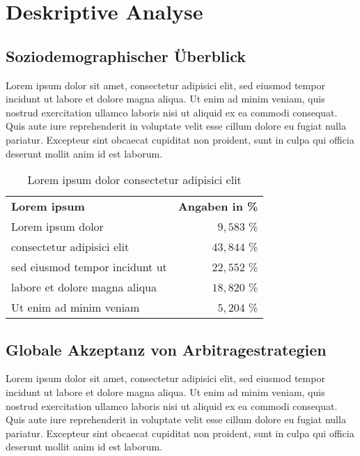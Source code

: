 \section{Deskriptive Analyse}
\subsection{Soziodemographischer Überblick}
Lorem ipsum dolor sit amet, consectetur adipisici elit, sed eiusmod tempor incidunt ut labore et dolore magna aliqua. Ut enim ad minim veniam, quis nostrud exercitation ullamco laboris nisi ut aliquid ex ea commodi consequat. Quis aute iure reprehenderit in voluptate velit esse cillum dolore eu fugiat nulla pariatur. Excepteur sint obcaecat cupiditat non proident, sunt in culpa qui officia deserunt mollit anim id est laborum.

\begin{table}[!ht]
     \centering
     \begin{tabular}{lr}
       \textbf{Lorem ipsum}  & \textbf{Angaben in \%}\\
       Lorem ipsum dolor            & $9{,}583 $ \%             \\
       consectetur adipisici elit       & $43{,}844 $ \%             \\
       sed eiusmod tempor incidunt ut  & $22{,}552 $ \%             \\
       labore et dolore magna aliqua &  $18{,}820 $ \%           \\
       Ut enim ad minim veniam & $5{,}204 $ \%\\
     \end{tabular}

     \caption{Lorem ipsum dolor consectetur adipisici elit}
     \label{tbl:Tabelle 2}

   \end{table}
   

\subsection{Globale Akzeptanz von Arbitragestrategien}
Lorem ipsum dolor sit amet, consectetur adipisici elit, sed eiusmod tempor incidunt ut labore et dolore magna aliqua. Ut enim ad minim veniam, quis nostrud exercitation ullamco laboris nisi ut aliquid ex ea commodi consequat. Quis aute iure reprehenderit in voluptate velit esse cillum dolore eu fugiat nulla pariatur. Excepteur sint obcaecat cupiditat non proident, sunt in culpa qui officia deserunt mollit anim id est laborum.
